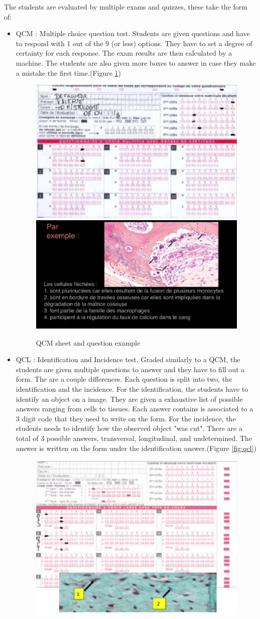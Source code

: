\documentclass[a4paper,11pt]{report}
\numberwithin{figure}{section} %
\begin{document}
	The students are evaluated by multiple exams and quizzes, these take the form of:
    \begin{itemize}
    \item[\textbullet]  QCM : Multiple choice question test. Students are given questions and have to respond with 1 out of the 9 (or less) options. They have to set a degree of certainty for each response. The exam results are then calculated by a machine. The students are also given more boxes to answer in case they make a mistake the first time.(Figure \ref{fig:qcm})
    \begin{figure}[H]
    \centering
     \includegraphics[width=0.4\linewidth]{exam_qcm.png}
     \includegraphics[width=0.5\linewidth]{exam_qcm2.png}
     \caption{QCM sheet and question example}
     \label{fig:qcm}
    \end{figure}
	\item[\textbullet]  QCL : Identification and Incidence test. Graded similarly to a QCM, the students are given multiple questions to answer and they have to fill out a form. The are a couple differences. Each question is split into two, the identification and the incidence. For the identification, the students have to identify an object on a image. They are given a exhaustive list of possible answers ranging from cells to tissues. Each answer contains is associated to a 3 digit code that they need to write on the form. For the incidence, the students needs to identify how the observed object "was cut". There are a total of 3 possible answers, transversal, longitudinal, and undetermined. The answer is written on the form under the identification answer.(Figure \ref{fig:qcl})
      \begin{figure}[H]
    \centering
     \includegraphics[width=0.42\linewidth]{exam_qcl2.png}

\end{figure}
\end{itemize}
\end{document}

